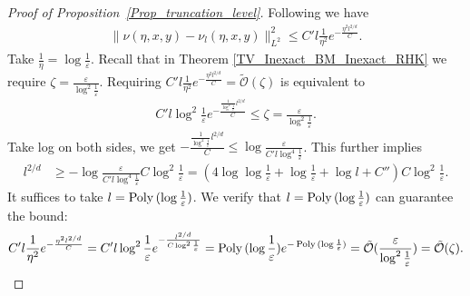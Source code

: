 \begin{proof}[Proof of Proposition~\ref{Prop_truncation_level}]
    Following \citet[Proof of Proposition 21]{azangulov2022stationary} we have 
    \begin{align*}
        \|\nu(\eta, x, y) - \nu_{l}(\eta, x, y)\|_{L^{2}}^{2}
        \le C' l \frac{1}{\eta^{2}}e^{-\frac{\eta^{2} l^{2/d}}{C}}.
    \end{align*}
    Take $\frac{1}{\eta} = \log \frac{1}{\varepsilon}$.
    Recall that in Theorem \ref{TV_Inexact_BM_Inexact_RHK} we require $\zeta = \frac{\varepsilon}{\log^{2} \frac{1}{\varepsilon}}$.
    Requiring $ C' l \frac{1}{\eta^{2}}e^{-\frac{\eta^{2} l^{2/d}}{C}} = \tilde{\mathcal{O}}(\zeta)$
    is equivalent to 
    \begin{align*}
        C' l \log^{2}\frac{1}{ \varepsilon}e^{-\frac{\frac{1}{\log^{2}\frac{1}{\varepsilon}} l^{2/d}}{C}} \le \zeta = \frac{\varepsilon}{\log^{2} \frac{1}{\varepsilon}}.
    \end{align*}
    Take log on both sides, we get $-\frac{\frac{1}{\log^{2}\frac{1}{\varepsilon}} l^{2/d}}{C} \le \log \frac{\varepsilon }{C' l \log^{4}\frac{1}{ \varepsilon}} $.
    This further implies 
    \begin{align*}
            l^{2/d} &\ge - \log \frac{\varepsilon }{C' l \log^{4}\frac{1}{ \varepsilon}} C\log^{2}\frac{1}{ \varepsilon}
            = (4\log \log \frac{1}{\varepsilon} + \log \frac{1}{\varepsilon} + \log l + C'') C\log^{2}\frac{1}{ \varepsilon}.
    \end{align*}
    It suffices to take $l = \operatorname{Poly\,} (\log \frac{1}{\varepsilon})$.
    We verify that $l = \operatorname{Poly\,} (\log \frac{1}{\varepsilon})$ can guarantee the bound:
    \begin{align*}
            C' l \frac{1}{\eta^{2}}e^{-\frac{\eta^{2} l^{2/d}}{C}}
            = C' l \log^2 \frac{1}{\varepsilon} e^{-\frac{l^{2/d}}{C \log^2 \frac{1}{\varepsilon}}} 
            = \operatorname{Poly\,} (\log \frac{1}{\varepsilon}) e^{-\operatorname{Poly\,} (\log \frac{1}{\varepsilon})} 
            = \tilde{\mathcal{O}}(\frac{\varepsilon}{\log^{2} \frac{1}{\varepsilon}}) = \tilde{\mathcal{O}}(\zeta).
    \end{align*}


\end{proof}
